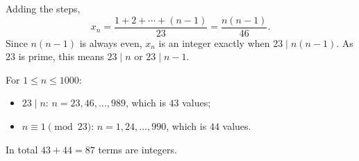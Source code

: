 Adding the steps,
\[x_n=\dfrac{1+2+\cdots+(n-1)}{23}=\dfrac{n(n-1)}{46}.\]
Since $n(n-1)$ is always even, $x_n$ is an integer exactly when $23\mid n(n-1)$. As $23$ is prime, this means $23\mid n$ or $23\mid n-1$.

For $1\le n\le1000$:
\begin{itemize}
\item $23\mid n$: $n=23,46,\dots,989$, which is $43$ values;
\item $n\equiv1\pmod{23}$: $n=1,24,\dots,990$, which is $44$ values.
\end{itemize}
In total $43+44=\boxed{87}$ terms are integers.
